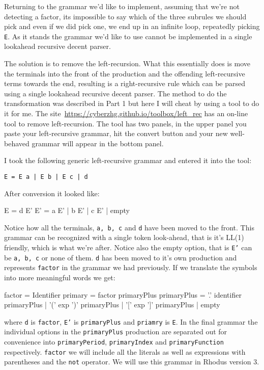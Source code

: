 Returning to the grammar we'd like to implement, assuming that we're not detecting a factor, its impossible to say which of the three subrules we should pick and even if we did pick one, we end up in an infinite loop, repeatedly picking {\tt E}. As it stands the grammar we'd like to use cannot be implemented in a single lookahead recursive decent parser.

The solution is to remove the left-recursion. What this essentially does is move the terminals into the front of the production and the offending left-recursive terms towards the end, resulting is a right-recursive rule which can be parsed using a single lookahead recursive decent parser. The method to do the transformation was described in Part 1 but here I will cheat by using a tool to do it for me. The site~\url{https://cyberzhg.github.io/toolbox/left_rec} has an on-line tool to remove left-recursion. The tool has two panels, in the upper panel you paste your left-recursive grammar, hit the convert button and your new well-behaved grammar will appear in the bottom panel.

I took the following generic left-recursive grammar and entered it into the tool:

{\tt  E = E a | E b | E c | d}

After conversion it looked like:
%
\begin{lcverbatim}
E   = d E'
E'  = a E'
    | b E'
    | c E'
    | empty
\end{lcverbatim}
%
Notice how all the terminals, {\tt a, b, c} and {\tt d} have been moved to the front. This grammar can be recognized with a single token look-ahead, that is it's LL(1) friendly, which is what we're after. Notice also the empty option, that is {\tt E'} can be {\tt a, b, c} or none of them. {\tt d} has been moved to it's own production and represents {\tt factor} in the grammar we had previously. If we translate the symbols into more meaningful words we get:
%
\begin{lcverbatim}
factor               = Identifier
primary              =  factor primaryPlus
primaryPlus          = '.' identifier primaryPlus
                     | '(' exp ')' primaryPlus
                     | '[' exp ']' primaryPlus
                     | empty
\end{lcverbatim}
%
where {\tt d} is {\tt factor}, {\tt E'} is {\tt primaryPlus} and {\tt priamry} is {\tt E}.  In the final grammar the individual options in the {\tt primaryPlus} production are separated out for convenience into {\tt primaryPeriod}, {\tt primaryIndex} and {\tt primaryFunction} respectively. {\tt factor} we will include all the literals as well as expressions with parentheses and the {\tt not} operator. We will use this grammar in Rhodus version 3.


\begin{center}
\end{center} 